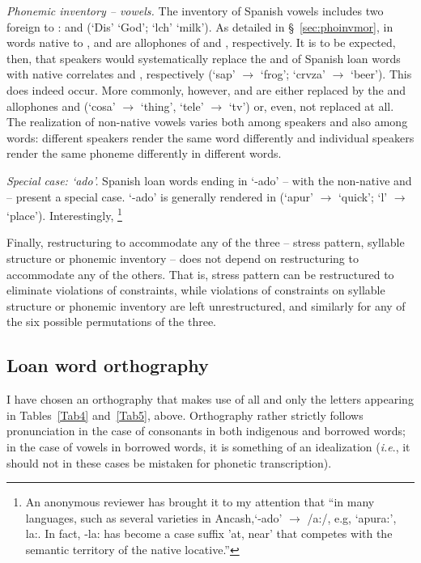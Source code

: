 \noindent
\emph{Phonemic inventory -- vowels.} The inventory of Spanish vowels includes two foreign to \SYQ{}:  and  (`Dis' `God'; `lch' `milk'). As detailed in \S~\ref{sec:phoinvmor}, in words native to \SYQ{}, \textipa{[o]} and \textipa{[e]} are allophones of  and , respectively. It is to be expected, then, that speakers would systematically replace the \textipa{[o]} and \textipa{[e]} of Spanish loan words with native correlates \textipa{[u]} and \textipa{[i]}, respectively (`sap' $\rightarrow$  `frog'; `crvza' $\rightarrow$  `beer'). This does indeed occur. More commonly, however, \textipa{[o]} and \textipa{[e]} are either replaced by the  and  allophones \textipa{[\textupsilon]} and \textipa{[\textsci]} (`cosa' $\rightarrow$ \textipa{[k\textupsilon{}sa]} `thing', `tele' $\rightarrow$  `tv') or, even, not replaced at all. The realization of non-native vowels varies both among speakers and also among words: different speakers render the same word differently and individual speakers render the same phoneme differently in different words.

\noindent
\emph{Special case: `ado'.} Spanish loan words ending in `-ado' -- with the non-native  and  -- present a special case. `-ado' is generally rendered \textipa{[aw]} in \SYQ{} (`apur' $\rightarrow$  `quick'; `l' $\rightarrow$  `place'). Interestingly, \footnote{An anonymous reviewer has brought it to my attention that ``in many \QI{} languages, such as several varieties in Ancash,`-ado' $\rightarrow$ /a:/, e.g, `apura:', la:. In fact, -la: has become a case suffix 'at, near' that competes with the semantic territory of the native locative.''}

Finally, restructuring to accommodate any of the three -- stress pattern, syllable structure or phonemic inventory -- does not depend on restructuring to accommodate any of the others. That is, stress pattern can be restructured to eliminate violations of \SYQ{} constraints, while violations of constraints on syllable structure or phonemic inventory are left unrestructured, and similarly for any of the six possible permutations of the three.

\subsection{Loan word orthography}
I have chosen an orthography that makes use of all and only the letters appearing in Tables~\ref{Tab4} and~\ref{Tab5}, above. Orthography rather strictly follows pronunciation in the case of consonants in both indigenous and borrowed words; in the case of vowels in borrowed words, it is something of an idealization (\textit{i.e}., it should not in these cases be mistaken for phonetic transcription). 

